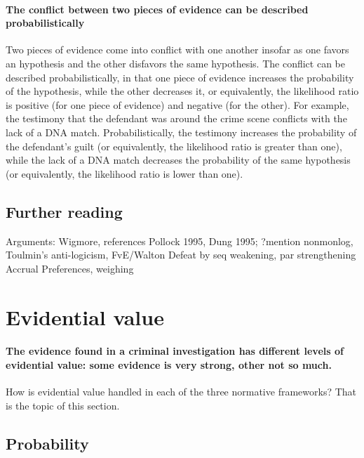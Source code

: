\documentclass[10pt]{article}
\begin{document}
\paragraph{The conflict between two pieces of evidence can be described probabilistically}
Two pieces of evidence come into 
conflict with one another insofar as one favors an hypothesis 
and the other disfavors the same hypothesis. 
The conflict can be described probabilistically, in that one piece of evidence increases 
the probability of the hypothesis, while the other decreases it, or equivalently, the likelihood ratio is positive (for one piece 
of evidence) and negative (for the other). 
For example, the testimony that the defendant was around the crime scene conflicts 
with the lack of a DNA match. Probabilistically, the testimony 
increases the probability of the defendant's guilt (or equivalently, the likelihood ratio is greater than one),
while the lack of a DNA match decreases the probability of the same hypothesis 
(or equivalently, the likelihood ratio is lower than one).







\subsection{Further reading}

Arguments: Wigmore, references Pollock 1995, Dung 1995; ?mention nonmonlog, Toulmin's anti-logicism, FvE/Walton
Defeat by seq weakening, par strengthening
Accrual
Preferences, weighing

\section{Evidential value}
\label{sec:str}

\paragraph{The evidence found in a criminal investigation has different levels of evidential value: some evidence is very strong, other not so much.} How is evidential value handled in each of the three normative frameworks? That is the topic of this section.

\subsection{Probability}
\end{document}
